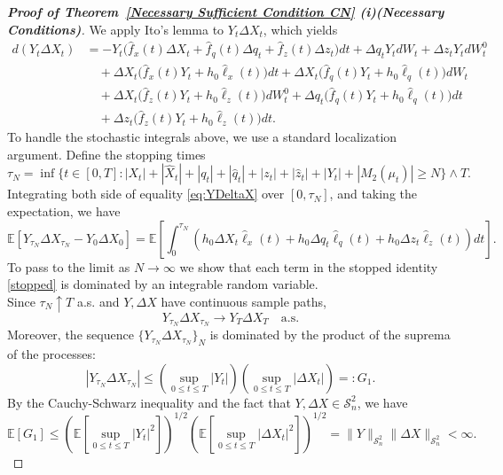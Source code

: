\documentclass[11pt,a4paper]{article}
\begin{document}
\begin{proof}[\textup{\textbf{Proof of Theorem~\ref{Necessary Sufficient Condition CN} (i)(Necessary Conditions)}}]

We apply Ito's lemma to $Y_t\Delta{X}_t$, which yields 
   \begin{align}
       d(Y_t \Delta{X}_t) 
       &= -Y_t \Big(\hat f_x(t)\Delta{X}_t+ \hat f_q(t)\Delta{q}_t+ \hat f_z(t)\Delta{z}_t\Big) dt+\Delta{q}_tY_t dW_t+\Delta{z}_t Y_t  dW_t^0 \nonumber\\
       &\quad +\Delta{X}_t \Big(\hat f_x(t) Y_t+h_0 \hat \ell_x(t)\Big) dt+\Delta{X}_t\Big( \hat f_q(t) Y_t+h_0 \hat \ell_q(t)\Big) dW_t\nonumber \\
       &\quad + \Delta{X}_t\Big( \hat f_z(t)Y_t+h_0 \hat \ell_z(t)\Big) dW_t^0+ \Delta{q}_t\Big( \hat f_q(t) Y_t+h_0 \hat \ell_q(t)\Big) dt \nonumber\\
       &\quad +\Delta {z}_t\Big( \hat f_z(t) Y_t+h_0\hat \ell_z(t)\Big) dt. \label{eq:YDeltaX}
   \end{align}
To handle the stochastic integrals above, we use a standard localization argument. Define the stopping times
\[
\tau_N= \inf\Big\{ t\in[0,T]:|X_t|+|\hat X_t|+|q_t|+|\hat q_t|+|z_t|+|\hat z_t|+|Y_t|+|M_2(\mu_t)|\geq N \Big\}\wedge T .
\]
Integrating both side of equality \eqref{eq:YDeltaX} over $[0,\tau_N]$, and taking the expectation, we have
\begin{equation}
\label{stopped}
   \mathbb E\left[Y_{\tau_N}\Delta X_{\tau_N}-Y_0\Delta X_0\right]
= \mathbb E \left[\int_0^{\tau_N}
\left(h_0\Delta X_t\hat \ell_x(t)+h_0\Delta q_t\hat \ell_q(t)+h_0\Delta z_t\hat \ell_z(t)\right)dt \right]. 
\end{equation}
To pass to the limit as $N \to \infty$ we show that each term in the stopped identity \eqref{stopped} is dominated by an integrable random variable.\\ 
Since $\tau_N\uparrow T$ a.s. and $Y,\Delta X$ have continuous sample paths,
\[Y_{\tau_N}\Delta X_{\tau_N}\to Y_T\Delta X_T \quad\text{a.s.}
\]
Moreover, the sequence $\{Y_{\tau_N} \Delta X_{\tau_N}\}_N$ is dominated by the product of the suprema of the processes:
\[
|Y_{\tau_N} \Delta X_{\tau_N}| \leq \left( \sup_{0 \leq t \leq T} |Y_t| \right) \left( \sup_{0 \leq t \leq T} |\Delta X_t| \right) =: G_1.
\]
By the Cauchy-Schwarz inequality and the fact that $Y, \Delta X \in \mathcal{S}^2_n$, we have
\[
\mathbb{E}[G_1] \leq \left( \mathbb{E} \left[\sup_{0\leq t\leq T} |Y_t|^2\right] \right)^{1/2} \left( \mathbb{E} \left[\sup_{0\leq t\leq T} |\Delta X_t|^2 \right] \right)^{1/2} = \|Y\|_{\mathcal{S}^2_n} \|\Delta X\|_{\mathcal{S}^2_n} < \infty.
\]
\end{proof}
\end{document}

